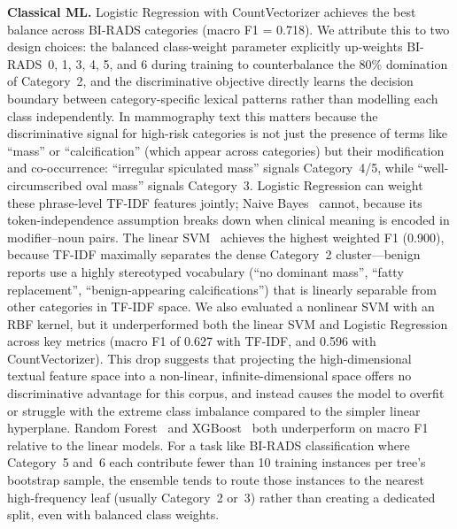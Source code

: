 \documentclass[11pt,a4paper]{article}
\begin{document}
\textbf{Classical ML.}
Logistic Regression with CountVectorizer achieves the best balance across
BI-RADS categories (macro F1 = 0.718).
We attribute this to two design choices: the balanced class-weight parameter
explicitly up-weights BI-RADS~0, 1, 3, 4, 5, and 6 during training to
counterbalance the 80\% domination of Category~2, and the discriminative
objective directly learns the decision boundary between category-specific
lexical patterns rather than modelling each class independently.
In mammography text this matters because the discriminative signal for
high-risk categories is not just the presence of terms like ``mass'' or
``calcification'' (which appear across categories) but their modification and
co-occurrence: ``irregular spiculated mass'' signals Category~4/5, while
``well-circumscribed oval mass'' signals Category~3.
Logistic Regression can weight these phrase-level TF-IDF features jointly;
Naive Bayes~\cite{mccallum1998naive} cannot, because its token-independence
assumption breaks down when clinical meaning is encoded in modifier--noun pairs.
The linear SVM~\cite{joachims1998text} achieves the highest weighted F1 (0.900),
because TF-IDF maximally separates the dense Category~2 cluster---benign
reports use a highly stereotyped vocabulary (``no dominant mass'', ``fatty
replacement'', ``benign-appearing calcifications'') that is linearly separable
from other categories in TF-IDF space.
We also evaluated a nonlinear SVM with an RBF kernel, but it underperformed
both the linear SVM and Logistic Regression across key metrics (macro F1 of
0.627 with TF-IDF, and 0.596 with CountVectorizer). This drop suggests that
projecting the high-dimensional textual feature space into a non-linear,
infinite-dimensional space offers no discriminative advantage for this corpus,
and instead causes the model to overfit or struggle with the extreme
class imbalance compared to the simpler linear hyperplane.
Random Forest~\cite{breiman2001random} and XGBoost~\cite{chen2016xgboost}
both underperform on macro F1 relative to the linear models.
For a task like BI-RADS classification where Category~5 and~6 each contribute
fewer than 10 training instances per tree's bootstrap sample, the ensemble
tends to route those instances to the nearest high-frequency leaf (usually
Category~2 or~3) rather than creating a dedicated split, even with balanced
class weights.
\end{document}
